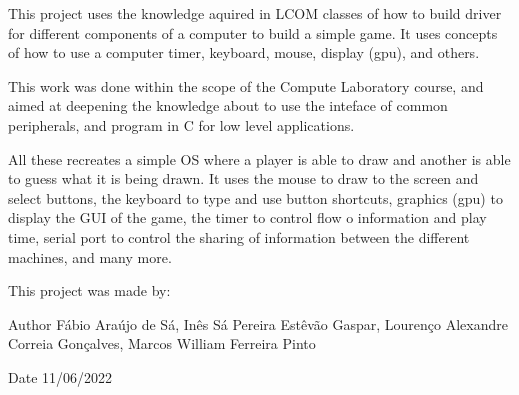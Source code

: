 This project uses the knowledge aquired in LCOM classes of how to build driver for different components of a computer to build a simple game. It uses concepts of how to use a computer timer, keyboard, mouse, display (gpu), and others.

This work was done within the scope of the Compute Laboratory course, and aimed at deepening the knowledge about to use the inteface of common peripherals, and program in C for low level applications.

All these recreates a simple OS where a player is able to draw and another is able to guess what it is being drawn. It uses the mouse to draw to the screen and select buttons, the keyboard to type and use button shortcuts, graphics (gpu) to display the GUI of the game, the timer to control flow o information and play time, serial port to control the sharing of information between the different machines, and many more.

This project was made by\+: \begin{DoxyAuthor}{Author}
Fábio Araújo de Sá, Inês Sá Pereira Estêvão Gaspar, Lourenço Alexandre Correia Gonçalves, Marcos William Ferreira Pinto
\end{DoxyAuthor}
\begin{DoxyDate}{Date}
11/06/2022 
\end{DoxyDate}
